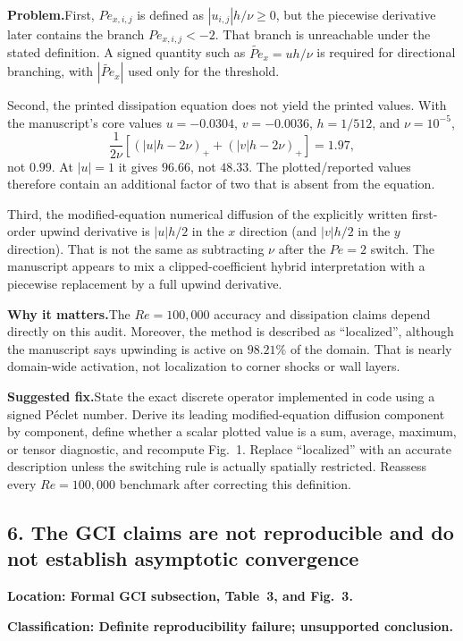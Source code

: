 \documentclass[11pt]{article}
\newcommand{\classification}[1]{\par\noindent\textbf{Classification: #1.}\par}
\newcommand{\location}[1]{\textbf{Location: #1}}
\newcommand{\problem}{\noindent\textbf{Problem.}\hspace{0.35em}}
\newcommand{\importance}{\par\noindent\textbf{Why it matters.}\hspace{0.35em}}
\newcommand{\fix}{\par\noindent\textbf{Suggested fix.}\hspace{0.35em}}
\begin{document}
\problem First, $Pe_{x,i,j}$ is defined as $|u_{i,j}|h/\nu\ge0$, but the piecewise derivative later contains the branch $Pe_{x,i,j}<-2$.  That branch is unreachable under the stated definition.  A signed quantity such as $\widetilde{Pe}_x=u h/\nu$ is required for directional branching, with $|\widetilde{Pe}_x|$ used only for the threshold.

Second, the printed dissipation equation does not yield the printed values.  With the manuscript's core values $u=-0.0304$, $v=-0.0036$, $h=1/512$, and $\nu=10^{-5}$,
\[
\frac{1}{2\nu}\left[(|u|h-2\nu)_+ + (|v|h-2\nu)_+\right]=1.97,
\]
not $0.99$.  At $|u|=1$ it gives $96.66$, not $48.33$.  The plotted/reported values therefore contain an additional factor of two that is absent from the equation.

Third, the modified-equation numerical diffusion of the explicitly written first-order upwind derivative is $|u|h/2$ in the $x$ direction (and $|v|h/2$ in the $y$ direction).  That is not the same as subtracting $\nu$ after the $Pe=2$ switch.  The manuscript appears to mix a clipped-coefficient hybrid interpretation with a piecewise replacement by a full upwind derivative.

\importance The $Re=100{,}000$ accuracy and dissipation claims depend directly on this audit.  Moreover, the method is described as ``localized'', although the manuscript says upwinding is active on $98.21\%$ of the domain.  That is nearly domain-wide activation, not localization to corner shocks or wall layers.

\fix State the exact discrete operator implemented in code using a signed P\'eclet number.  Derive its leading modified-equation diffusion component by component, define whether a scalar plotted value is a sum, average, maximum, or tensor diagnostic, and recompute Fig.~1.  Replace ``localized'' with an accurate description unless the switching rule is actually spatially restricted.  Reassess every $Re=100{,}000$ benchmark after correcting this definition.

\subsection*{6. The GCI claims are not reproducible and do not establish asymptotic convergence}

\location{Formal GCI subsection, Table~3, and Fig.~3.}

\classification{Definite reproducibility failure; unsupported conclusion}
\end{document}

